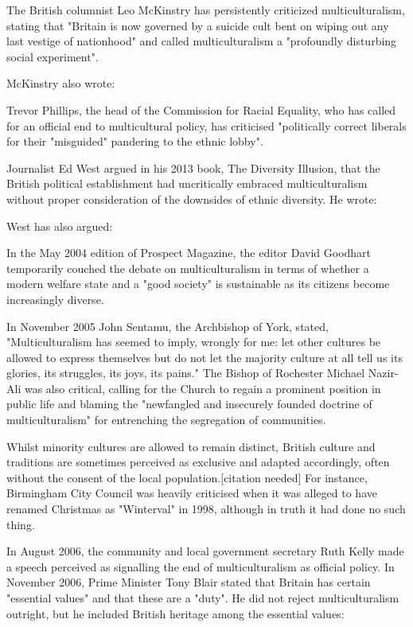 The British columnist Leo McKinstry has persistently criticized
multiculturalism, stating that "Britain is now governed by a suicide
cult bent on wiping out any last vestige of nationhood" and called
multiculturalism a "profoundly disturbing social experiment".

McKinstry also wrote:

Trevor Phillips, the head of the Commission for Racial Equality, who has
called for an official end to multicultural policy, has criticised
"politically correct liberals for their "misguided" pandering to the
ethnic lobby".

Journalist Ed West argued in his 2013 book, The Diversity Illusion, that
the British political establishment had uncritically embraced
multiculturalism without proper consideration of the downsides of ethnic
diversity. He wrote:

West has also argued:

In the May 2004 edition of Prospect Magazine, the editor David Goodhart
temporarily couched the debate on multiculturalism in terms of whether a
modern welfare state and a "good society" is sustainable as its citizens
become increasingly diverse.

In November 2005 John Sentamu, the Archbishop of York, stated,
"Multiculturalism has seemed to imply, wrongly for me: let other
cultures be allowed to express themselves but do not let the majority
culture at all tell us its glories, its struggles, its joys, its pains."
The Bishop of Rochester Michael Nazir-Ali was also critical, calling for
the Church to regain a prominent position in public life and blaming the
"newfangled and insecurely founded doctrine of multiculturalism" for
entrenching the segregation of communities.

Whilst minority cultures are allowed to remain distinct, British culture
and traditions are sometimes perceived as exclusive and adapted
accordingly, often without the consent of the local
population.{[}citation needed{]} For instance, Birmingham City Council
was heavily criticised when it was alleged to have renamed Christmas as
"Winterval" in 1998, although in truth it had done no such thing.

In August 2006, the community and local government secretary Ruth Kelly
made a speech perceived as signalling the end of multiculturalism as
official policy. In November 2006, Prime Minister Tony Blair stated that
Britain has certain "essential values" and that these are a "duty". He
did not reject multiculturalism outright, but he included British
heritage among the essential values:

